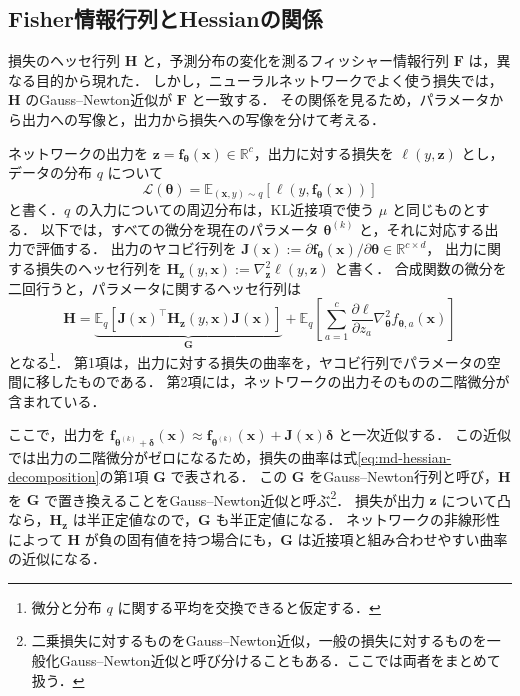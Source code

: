 \documentclass[../main.tex]{subfiles}
\begin{document}
\subsection{Fisher情報行列とHessianの関係}
\label{subsec:md-fisher-hessian}

損失のヘッセ行列 $\bm{H}$ と，予測分布の変化を測るフィッシャー情報行列 $\bm{F}$ は，異なる目的から現れた．
しかし，ニューラルネットワークでよく使う損失では，$\bm{H}$ のGauss--Newton近似が $\bm{F}$ と一致する．
その関係を見るため，パラメータから出力への写像と，出力から損失への写像を分けて考える\cite{grosse2021metrics,grosse2021secondorder}．

ネットワークの出力を $\bm{z}=\bm{f}_{\bm{\theta}}(\bm{x})\in\mathbb{R}^c$，出力に対する損失を $\ell(y,\bm{z})$ とし，
データの分布 $q$ について
\begin{equation}
  \mathcal{L}(\bm{\theta})
  =\mathbb{E}_{(\bm{x},y)\sim q}
  [\ell(y,\bm{f}_{\bm{\theta}}(\bm{x}))]
  \label{eq:md-composite-loss}
\end{equation}
と書く．$q$ の入力についての周辺分布は，KL近接項で使う $\mu$ と同じものとする．
以下では，すべての微分を現在のパラメータ $\bm{\theta}^{(k)}$ と，それに対応する出力で評価する．
出力のヤコビ行列を $\bm{J}(\bm{x}):=\partial\bm{f}_{\bm{\theta}}(\bm{x})/\partial\bm{\theta}\in\mathbb{R}^{c\times d}$，
出力に関する損失のヘッセ行列を $\bm{H}_{\bm{z}}(y,\bm{x}):=\nabla_{\bm{z}}^2\ell(y,\bm{z})$ と書く．
合成関数の微分を二回行うと，パラメータに関するヘッセ行列は
\begin{equation}
  \bm{H}
  =\underbrace{\mathbb{E}_{q}
  [\bm{J}(\bm{x})^\top\bm{H}_{\bm{z}}(y,\bm{x})\bm{J}(\bm{x})]}_{\displaystyle\bm{G}}
  +\mathbb{E}_{q}\left[
    \sum_{a=1}^c\frac{\partial\ell}{\partial z_a}
    \nabla_{\bm{\theta}}^2 f_{\bm{\theta},a}(\bm{x})\right]
  \label{eq:md-hessian-decomposition}
\end{equation}
となる\footnote{微分と分布 $q$ に関する平均を交換できると仮定する．}．
第1項は，出力に対する損失の曲率を，ヤコビ行列でパラメータの空間に移したものである．
第2項には，ネットワークの出力そのものの二階微分が含まれている．

ここで，出力を $\bm{f}_{\bm{\theta}^{(k)}+\bm{\delta}}(\bm{x})
\approx\bm{f}_{\bm{\theta}^{(k)}}(\bm{x})+\bm{J}(\bm{x})\bm{\delta}$ と一次近似する．
この近似では出力の二階微分がゼロになるため，損失の曲率は式\eqref{eq:md-hessian-decomposition}の第1項 $\bm{G}$ で表される．
この $\bm{G}$ をGauss--Newton行列と呼び，$\bm{H}$ を $\bm{G}$ で置き換えることをGauss--Newton近似と呼ぶ\footnote{二乗損失に対するものをGauss--Newton近似，一般の損失に対するものを一般化Gauss--Newton近似と呼び分けることもある．ここでは両者をまとめて扱う．}．
損失が出力 $\bm{z}$ について凸なら，$\bm{H}_{\bm{z}}$ は半正定値なので，$\bm{G}$ も半正定値になる．
ネットワークの非線形性によって $\bm{H}$ が負の固有値を持つ場合にも，$\bm{G}$ は近接項と組み合わせやすい曲率の近似になる．
\end{document}
